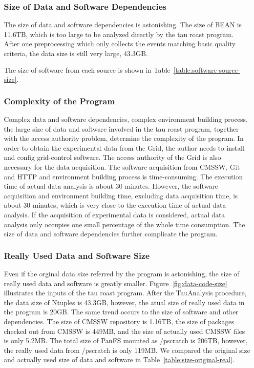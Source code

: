\documentclass{acm_proc_article-sp}
\begin{document}
\subsubsection{Size of Data and Software Dependencies}
The size of data and software dependencies is astonishing.
The size of BEAN is 11.6TB, which is too large to be analyzed directly by the tau roast program. After one preprocessing which only collects the events matching basic quality criteria, the data size is still very large, 43.3GB. 

The size of software from each source is shown in Table~\ref{table:software-source-size}.

\subsubsection{Complexity of the Program}
Complex data and software dependencies, complex environment building process, the large size of data and software involved in the tau roast program, together with the access authority problem, determine the complexity of the program. 
In order to obtain the experimental data from the Grid, the author needs to install and config grid-control software. 
The access authority of the Grid is also necessary for the data acquisition.
The software acquisition from CMSSW, Git and HTTP and environment building process is time-consuming. The execution time of actual data analysis is about 30 minutes. However, the software acquisition and environment building time, excluding data acquisition time, is about 30 minutes, which is very close to the execution time of actual data analysis. If the acquisition of experimental data is considered, actual data analysis only occupies one small percentage of the whole time consumption.
The size of data and software dependencies further complicate the program.

\subsubsection{Really Used Data and Software Size} 

Even if the orginal data size referred by the program is astonishing, the size
of really used data and software is greatly smaller.
Figure~\ref{fig:data-code-size} illustrates the inputs of the tau roast program.
After the TauAnalysis procedure, the data size of Ntuples is 43.3GB, however, the atual size of really used
data in the program is 20GB.  The same trend occurs to the size of software and
other dependencies. The size of CMSSW repository is 1.16TB, the size of
packages checked out from CMSSW is 449MB, and the size of actually used CMSSW
files is only 5.2MB. 
The total size of PanFS mounted as /pscratch is 206TB, however, the really used data from /pscratch is only 119MB.
We compared the original size and actually used size of data and software in Table~\ref{table:size-original-real}.
\end{document}
